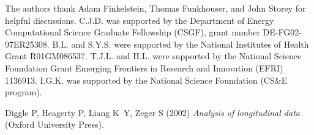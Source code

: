 \documentclass{pnastwo}
\begin{document}
\begin{article}


\begin{acknowledgments}
The authors thank Adam Finkelstein,  Thomas Funkhouser, and John Storey for helpful discussions. 
%
C.J.D. was supported by the Department of Energy Computational Science Graduate Fellowship (CSGF), grant number DE-FG02-97ER25308.
%
B.L. and S.Y.S. were supported by the National Institutes of Health Grant R01GM086537. 
%
T.J.L. and H.L. were supported by the National Science Foundation Grant Emerging Frontiers in Research and Innovation (EFRI) 1136913.
%
I.G.K. was supported by the National Science Foundation (CS\&E program).
\end{acknowledgments}






%
%

\begin{thebibliography}{10}

Diggle P, Heagerty P, Liang K~Y, Zeger S (2002) \textit{Analysis of
  longitudinal data} (Oxford University Press).


\end{thebibliography}
\end{article}
\end{document}
